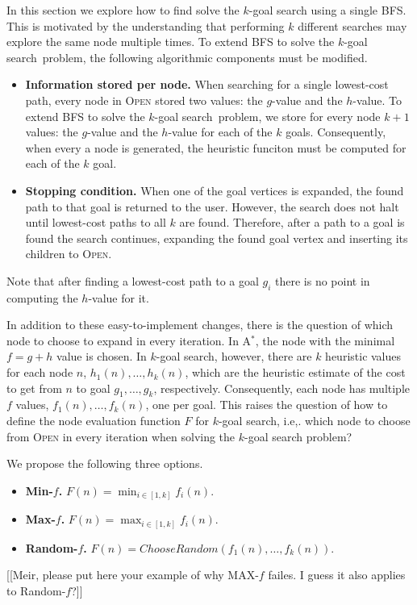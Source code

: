 \documentclass{aicom2e}
\newcommand{\kgs}{$k$-goal search}
\newcommand{\astar}{A$^*$}
\newcommand{\open}{\textsc{Open}}
\begin{document}
In this section we explore how to find solve the \kgs{} using a single BFS. This is motivated by the understanding that performing $k$ different searches may
explore the same node multiple times. 
To extend BFS to solve the \kgs\ problem, the following algorithmic components 
must be modified. 

\begin{itemize}
    \item {\bf Information stored per node.} When searching for a single lowest-cost path, every node in \open{} stored two values: the $g$-value and the $h$-value. To extend BFS to solve the \kgs\ problem, we store for every node $k+1$ values: the $g$-value and the $h$-value for each of the $k$ goals. Consequently, when every a node is generated, the heuristic funciton must be computed for each of the $k$ goal.
    \item {\bf Stopping condition.} When one of the goal vertices is expanded, the found path to that goal is returned to the user. However, the search does not halt until lowest-cost paths to all $k$ are found. Therefore, after a path to a goal is found the search continues, expanding the found goal vertex and inserting its children to \open . 
\end{itemize}
Note that after finding a lowest-cost path to a goal $g_i$ there is no point in
computing the $h$-value for it. 

In addition to these easy-to-implement changes, 
there is the question of which node to choose to expand in every iteration. 
In \astar{}, the node with the minimal $f=g+h$ value is chosen. 
In \kgs{}, however, there are $k$ heuristic values for each node $n$, $h_1(n),\ldots,h_k(n)$, 
which are the heuristic estimate of the cost to get from $n$ to goal $g_1,\ldots,g_k$, respectively.  
Consequently, each node has multiple  $f$ values, $f_1(n),\ldots,f_k(n)$, one per goal. 
This raises the question of how to define the node evaluation function $F$ for \kgs{}, 
i.e,. which node to choose from \open{} in every iteration when solving the \kgs{} problem?


 
 We propose the following three options. 
 \begin{itemize}
     \item {\bf Min-$f$.} $F(n)=\min_{i\in [1,k]}f_i(n)$. 
     \item {\bf Max-$f$.} $F(n)=\max_{i\in [1,k]}f_i(n)$. 
     \item {\bf Random-$f$.} $F(n)=ChooseRandom(f_1(n),\ldots,f_k(n))$. 
 \end{itemize}
 [[Meir, please put here your example of why MAX-$f$ failes. I guess it also applies to Random-$f$?]]
\end{document}
